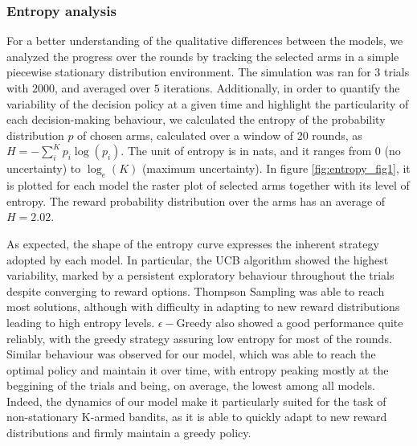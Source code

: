 \subsubsection{Entropy analysis}\label{sec:entropy}
\noindent For a better understanding of the qualitative differences between the models, we analyzed the progress over the rounds by tracking the selected arms in a simple piecewise stationary distribution environment.
The simulation was ran for $3$ trials with $2000$, and averaged over $5$ iterations.
Additionally, in order to quantify the variability of the decision policy at a given time and highlight the particularity of each decision-making behaviour, we calculated the entropy of the probability distribution $p$ of chosen arms, calculated over a window of 20 rounds, as $H=-\sum^{K}_{i} p_{i}\log(p_{i})$.
The unit of entropy is in nats, and it ranges from $0$ (no uncertainty) to $\log_{e}(K)$ (maximum uncertainty).
In figure \ref{fig:entropy_fig1}, it is plotted for each model the raster plot of selected arms together with its level of entropy. The reward probability distribution over the arms has an average of $H=2.02$.

As expected, the shape of the entropy curve expresses the inherent strategy adopted by each model.
In particular, the UCB algorithm showed the highest variability, marked by a persistent exploratory behaviour throughout the trials despite converging to reward options. Thompson Sampling was able to reach most solutions, although with difficulty in adapting to new reward distributions
leading to high entropy levels.
$\epsilon-$Greedy also showed a good performance quite reliably, with the greedy strategy assuring low entropy for most of the rounds.
Similar behaviour was observed for our model, which was able to reach the optimal policy and maintain it over time, with entropy peaking mostly at the beggining of the trials and being, on average, the lowest among all models.
Indeed, the dynamics of our model make it particularly suited for the task of non-stationary K-armed bandits, as it is able to quickly adapt to new reward distributions and firmly maintain a greedy policy.

